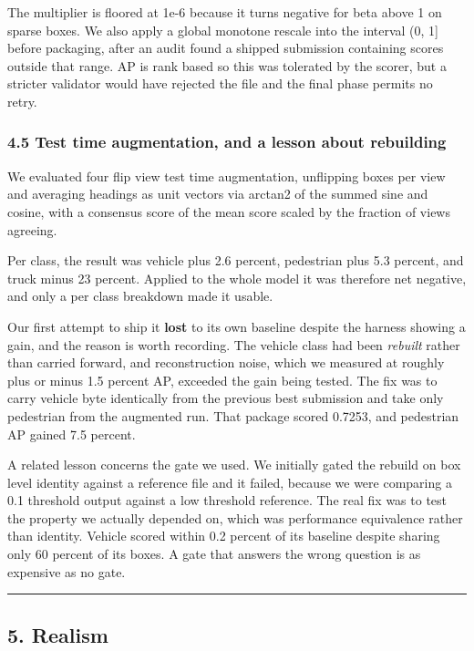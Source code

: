 \documentclass[
  10pt,
]{article}
\begin{document}
The multiplier is floored at 1e-6 because it turns negative for beta
above 1 on sparse boxes. We also apply a global monotone rescale into
the interval (0, 1{]} before packaging, after an audit found a shipped
submission containing scores outside that range. AP is rank based so
this was tolerated by the scorer, but a stricter validator would have
rejected the file and the final phase permits no retry.

\subsubsection{4.5 Test time augmentation, and a lesson about
rebuilding}\label{test-time-augmentation-and-a-lesson-about-rebuilding}

We evaluated four flip view test time augmentation, unflipping boxes per
view and averaging headings as unit vectors via arctan2 of the summed
sine and cosine, with a consensus score of the mean score scaled by the
fraction of views agreeing.

Per class, the result was vehicle plus 2.6 percent, pedestrian plus 5.3
percent, and truck minus 23 percent. Applied to the whole model it was
therefore net negative, and only a per class breakdown made it usable.

Our first attempt to ship it \textbf{lost} to its own baseline despite
the harness showing a gain, and the reason is worth recording. The
vehicle class had been \emph{rebuilt} rather than carried forward, and
reconstruction noise, which we measured at roughly plus or minus 1.5
percent AP, exceeded the gain being tested. The fix was to carry vehicle
byte identically from the previous best submission and take only
pedestrian from the augmented run. That package scored 0.7253, and
pedestrian AP gained 7.5 percent.

A related lesson concerns the gate we used. We initially gated the
rebuild on box level identity against a reference file and it failed,
because we were comparing a 0.1 threshold output against a low threshold
reference. The real fix was to test the property we actually depended
on, which was performance equivalence rather than identity. Vehicle
scored within 0.2 percent of its baseline despite sharing only 60
percent of its boxes. A gate that answers the wrong question is as
expensive as no gate.

\begin{center}\rule{0.5\linewidth}{0.5pt}\end{center}

\subsection{5. Realism}\label{realism}
\end{document}

